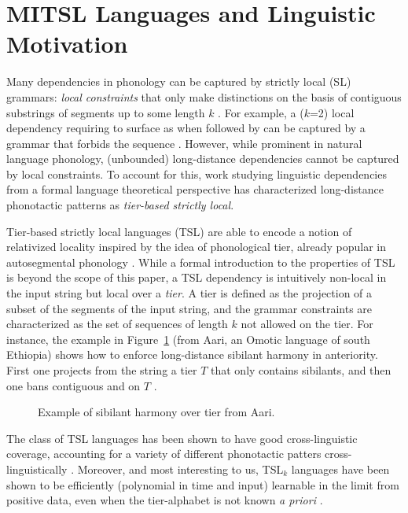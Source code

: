 \documentclass[11pt,a4paper]{article}
\begin{document}
\section{MITSL Languages and Linguistic Motivation}
\label{sec:MITSL}


Many dependencies in phonology can be captured by strictly local (SL) grammars: \emph{local constraints} that only make distinctions on the basis of contiguous substrings of segments up to some length $k$ \citep[essentially, $k$-grams;][]{Heinz2011a}.
For example, a ($k$=2) local dependency requiring  to surface as \textipa{[z]} when followed by \textipa{[l]} can be captured by a grammar that forbids the sequence \textipa{[sl]}.
However, while prominent in natural language phonology, (unbounded) long-distance dependencies cannot be captured by local constraints.
To account for this, work studying linguistic dependencies from a formal language theoretical perspective has characterized long-distance phonotactic patterns  as \emph{tier-based strictly local}.

Tier-based strictly local languages (TSL) are able to encode a notion of relativized locality inspired by the idea of phonological tier, already popular in autosegmental phonology   \cite{goldsmith1976autosegmental}.
While a  formal introduction  to the properties of TSL  is beyond the scope of this paper,  a TSL dependency is intuitively non-local in the input string but local over a \emph{tier}.
A tier is defined as the projection of a subset of the segments of the input string, and the grammar constraints are characterized as the set of sequences of length $k$ not allowed on the tier.
For instance, the example in Figure~\ref{fig:Aari} (from Aari, an Omotic language of south Ethiopia) shows how to enforce long-distance sibilant harmony in anteriority.
First one projects from the string a tier $T$ that only contains sibilants, and then one bans contiguous \textipa{[\textctyogh s]} and \textipa{[s\textctyogh]} on $T$  \cite[see][]{Hayward_Aari}.
%
 \begin{figure}[h!]
\begin{center}

\end{center}
\caption{Example of sibilant harmony over tier from Aari. }
\label{fig:Aari}
\end{figure}

The class of TSL languages has been shown to have good cross-linguistic coverage, accounting for a variety of different phonotactic patters cross-linguistically \citep{HeinzRawalTanner,McMullin16,Graf17Phonology}.
Moreover, and most interesting to us, TSL$_k$ languages have been shown to be efficiently (polynomial in time and input) learnable in the limit from positive data, even when the tier-alphabet is not known \emph{a priori}  \citep{JardineHeinz16,jardinemcmullin17}.
\end{document}
